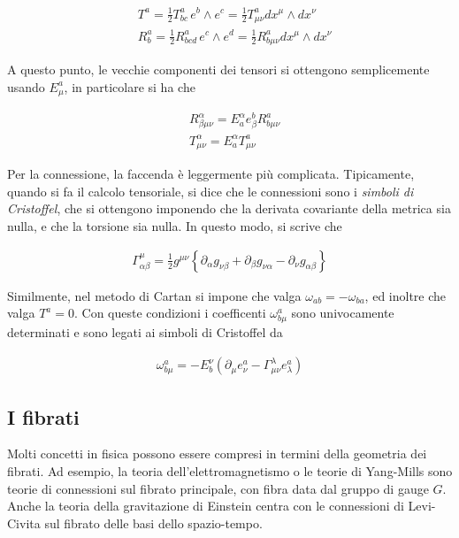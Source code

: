\documentclass{report}
\begin{document}
\begin{align}
    &T^a = \frac{1}{2}T^a_{bc} \, e^b \wedge e^c = \frac{1}{2}T^a_{\mu\nu}dx^{\mu}\wedge dx^{\nu}\\
    &R^a_b = \frac{1}{2}R^a_{bcd} \, e^c \wedge e^d = \frac{1}{2}R^a_{b\mu\nu} dx^{\mu}\wedge dx^{\nu}
\end{align}

A questo punto, le vecchie componenti dei tensori si ottengono semplicemente usando \(E^a_\mu\), in particolare si ha che 

\begin{align}
    &R^\alpha_{\beta\mu\nu} = E^\alpha_a e^b_\beta R^a_{b\mu\nu} \\
    & T^\alpha_{\mu\nu} = E^{\alpha}_aT^a_{\mu\nu}
\end{align}

Per la connessione, la faccenda è leggermente più complicata. Tipicamente, quando si fa il calcolo tensoriale, si dice che le connessioni sono i \emph{simboli di Cristoffel}, che si ottengono imponendo che la derivata covariante della metrica sia nulla, e che la torsione sia nulla. In questo modo, si scrive che 

\begin{align}
    \Gamma^\mu_{\alpha \beta} = \frac{1}{2}g^{\mu\nu}\left\{\partial_\alpha g_{\nu\beta} + \partial_\beta g_{\nu\alpha} - \partial_\nu g_{\alpha\beta}\right\}
\end{align}

Similmente, nel metodo di Cartan si impone che valga \(\omega_{ab} = -\omega_{ba}\), ed inoltre che valga \(T^a = 0\). Con queste condizioni i coefficenti \(\omega^a_{b\mu}\) sono univocamente determinati e sono legati ai simboli di Cristoffel da 

\begin{align}
    \omega^a_{b\mu} = -E^\nu_b (\partial_\mu e^a_\nu - \Gamma^\lambda_{\mu\nu}e^a_{\lambda})
\end{align}


\subsection{I fibrati}

Molti concetti in fisica possono essere compresi in termini della geometria dei fibrati. Ad esempio, la teoria dell'elettromagnetismo o le teorie di Yang-Mills sono teorie di connessioni sul fibrato principale, con fibra data dal gruppo di gauge \(G\). Anche la teoria della gravitazione di Einstein centra con le connessioni di Levi-Civita sul fibrato delle basi dello spazio-tempo. \\
\end{document}
